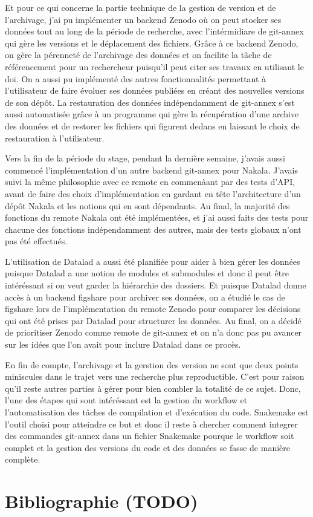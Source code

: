 \documentclass[11pt]{article}
\begin{document}
Et pour ce qui concerne la partie technique de la gestion de version
et de l'archivage, j'ai pu implémenter un backend Zenodo où on peut
stocker ses données tout au long de la période de recherche, avec
l'intérmidiare de git-annex qui gère les versions et le déplacement
des fichiers. Grâce à ce backend Zenodo, on gère la pérenneté de
l'archivage des données et on facilite la tâche de référencement pour
un rechercheur puisqu'il peut citer ses travaux en utilisant le
doi. On a aussi pu implémenté des autres fonctionnalités permettant à
l'utilisateur de faire évoluer ses données publiées en créant des
nouvelles versions de son dépôt. La restauration des données
indépendamment de git-annex s'est aussi automatisée grâce à un
programme qui gère la récupération d'une archive des données et de
restorer les fichiers qui figurent dedans en laissant le choix de
restauration à l'utilisateur.

Vers la fin de la période du stage, pendant la dernière semaine,
j'avais aussi commencé l'implémentation d'un autre backend git-annex
pour Nakala. J'avais suivi la même philosophie avec ce remote en
commenàant par des tests d'API, avant de faire des choix
d'implémentation en gardant en tête l'architecture d'un dépôt Nakala
et les notions qui en sont dépendants. Au final, la majorité des
fonctions du remote Nakala ont été implémentées, et j'ai aussi faits
des tests pour chacune des fonctions indépendamment des autres, mais
des tests globaux n'ont pas été effectués.

L'utilisation de Datalad a aussi été planifiée pour aider à bien gérer
les données puisque Datalad a une notion de modules et submodules et
donc il peut être intéréssant si on veut garder la hiérarchie des
dossiers. Et puisque Datalad donne accès à un backend figshare pour
archiver ses données, on a étudié le cas de figshare lors de
l'implémentation du remote Zenodo pour comparer les décisions qui ont
été prises par Datalad pour structurer les données. Au final, on a
décidé de prioritiser Zenodo comme remote de git-annex et on n'a donc
pas pu avancer sur les idées que l'on avait pour inclure Datalad dans
ce procès.

En fin de compte, l'archivage et la gerstion des version ne sont que
deux points miniscules dans le trajet vers une recherche plus
reproductible. C'est pour raison qu'il reste autres parties à gérer
pour bien combler la totalité de ce sujet. Donc, l'une des étapes qui
sont intéréssant est la gestion du workflow et l'automatisation des
tâches de compilation et d'exécution du code. Snakemake est l'outil
choisi pour atteindre ce but et donc il reste à chercher comment
integrer des commandes git-annex dans un fichier Snakemake pourque le
workflow soit complet et la gestion des versions du code et des
données se fasse de manière complète.

\section{Bibliographie (TODO)}
\label{sec:orgbfbfb1f}
\end{document}
